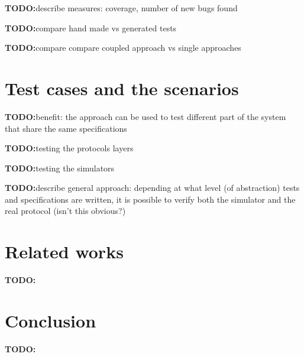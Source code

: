 \documentclass{article}
\newcommand{\todo}{\textbf{TODO:}}
\begin{document}
\todo describe measures: coverage, number of new bugs found

\todo compare hand made vs generated tests

\todo compare compare coupled approach vs single approaches


\section{Test cases and the scenarios}
\label{sec:test_cases_and_the_scenarios}

\todo benefit: the approach can be used to test different part of the system
that share the same specifications

\todo testing the protocols layers

\todo testing the simulators

\todo describe general approach: depending at what level (of abstraction) tests 
and specifications are written, it is possible to verify both the simulator and 
the real protocol (isn't this obvious?)


\section{Related works}
\label{sec:related_works}

\todo

\section{Conclusion}
\label{sec:conclusion}

\todo




\end{document}
